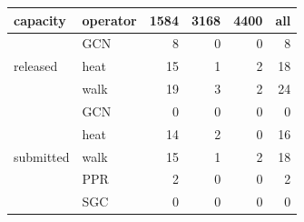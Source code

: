 \begin{tabular}{@{}llrrrr@{}}
\toprule
capacity & operator & 1584 & 3168 & 4400 & all \\
\midrule
\multirow{3}{*}{released} & GCN & 8 & 0 & 0 & 8 \\
 & heat & 15 & 1 & 2 & 18 \\
 & walk & 19 & 3 & 2 & 24 \\
\midrule
\multirow{5}{*}{submitted} & GCN & 0 & 0 & 0 & 0 \\
 & heat & 14 & 2 & 0 & 16 \\
 & walk & 15 & 1 & 2 & 18 \\
 & PPR & 2 & 0 & 0 & 2 \\
 & SGC & 0 & 0 & 0 & 0 \\
\bottomrule
\end{tabular}
